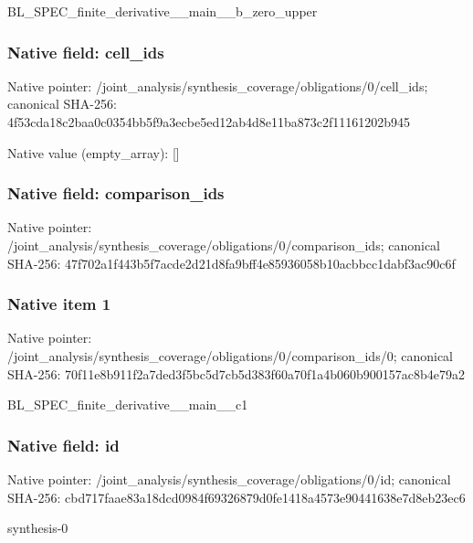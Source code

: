 \documentclass[10pt,a4paper]{article}
\begin{document}
\begingroup\raggedright\sloppy BL\_\allowbreak{}SPEC\_\allowbreak{}finite\_\allowbreak{}derivative\_\allowbreak{}\_\allowbreak{}main\_\allowbreak{}\_\allowbreak{}b\_\allowbreak{}zero\_\allowbreak{}upper\par\endgroup

\subsubsection{Native field: cell\_\allowbreak{}ids}
Native pointer: /joint\_\allowbreak{}analysis/synthesis\_\allowbreak{}coverage/obligations/0/cell\_\allowbreak{}ids; canonical SHA-256: 4f53cda18c2baa0c0354bb5f9a3ecbe5ed12ab4d8e11ba873c2f11161202b945

Native value (empty\_\allowbreak{}array): []

\subsubsection{Native field: comparison\_\allowbreak{}ids}
Native pointer: /joint\_\allowbreak{}analysis/synthesis\_\allowbreak{}coverage/obligations/0/comparison\_\allowbreak{}ids; canonical SHA-256: 47f702a1f443b5f7acde2d21d8fa9bff4e85936058b10acbbcc1dabf3ac90c6f

\subsubsection{Native item 1}
Native pointer: /joint\_\allowbreak{}analysis/synthesis\_\allowbreak{}coverage/obligations/0/comparison\_\allowbreak{}ids/0; canonical SHA-256: 70f11e8b911f2a7ded3f5bc5d7cb5d383f60a70f1a4b060b900157ac8b4e79a2

\begingroup\raggedright\sloppy BL\_\allowbreak{}SPEC\_\allowbreak{}finite\_\allowbreak{}derivative\_\allowbreak{}\_\allowbreak{}main\_\allowbreak{}\_\allowbreak{}c1\par\endgroup

\subsubsection{Native field: id}
Native pointer: /joint\_\allowbreak{}analysis/synthesis\_\allowbreak{}coverage/obligations/0/id; canonical SHA-256: cbd717faae83a18dcd0984f69326879d0fe1418a4573e90441638e7d8eb23ec6

\begingroup\raggedright\sloppy synthesis-0\par\endgroup
\end{document}
